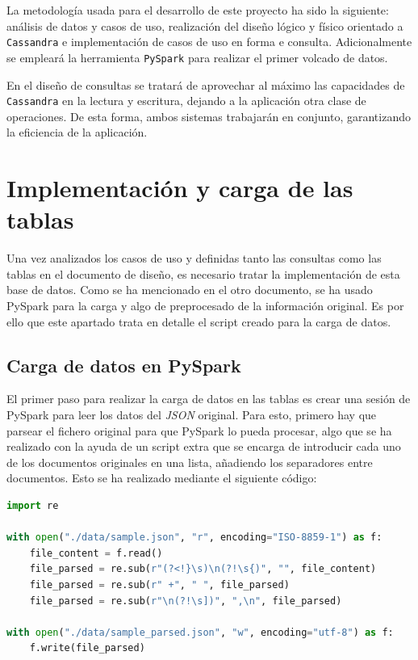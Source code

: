 \documentclass[]{article}
\begin{document}
La metodología usada para el desarrollo de este proyecto ha sido la siguiente:
análisis de datos y casos de uso, realización del diseño lógico y físico
orientado a \texttt{Cassandra} e implementación de casos de uso en forma e
consulta. Adicionalmente se empleará la herramienta \texttt{PySpark} para
realizar el primer volcado de datos.

En el diseño de consultas se tratará de aprovechar al máximo las capacidades de
\texttt{Cassandra} en la lectura y escritura, dejando a la aplicación otra clase de
operaciones. De esta forma, ambos sistemas trabajarán en conjunto, garantizando
la eficiencia de la aplicación.

\newpage
\section{Implementación y carga de las tablas}
\label{sec:implementacion}
Una vez analizados los casos de uso y definidas tanto las consultas como las tablas en el documento de diseño, es necesario tratar la implementación de esta base de datos. Como se ha mencionado en el otro documento, se ha usado PySpark para la carga y algo de preprocesado de la información original. Es por ello que este apartado trata en detalle el script creado para la carga de datos.

\subsection{Carga de datos en PySpark}
El primer paso para realizar la carga de datos en las tablas es crear una sesión de PySpark para leer los datos del \textit{JSON} original. Para esto, primero hay que parsear el fichero original para que PySpark lo pueda procesar, algo que se ha realizado con la ayuda de un script extra que se encarga de introducir cada uno de los documentos originales en una lista, añadiendo los separadores entre documentos. Esto se ha realizado mediante el siguiente código:

\lstset{style=python}
\begin{lstlisting}[language=python, caption=Parseo del JSON original]
import re

with open("./data/sample.json", "r", encoding="ISO-8859-1") as f:
    file_content = f.read()
    file_parsed = re.sub(r"(?<!}\s)\n(?!\s{)", "", file_content)
    file_parsed = re.sub(r" +", " ", file_parsed)
    file_parsed = re.sub(r"\n(?!\s])", ",\n", file_parsed)

with open("./data/sample_parsed.json", "w", encoding="utf-8") as f:
    f.write(file_parsed)
\end{lstlisting}
\end{document}
